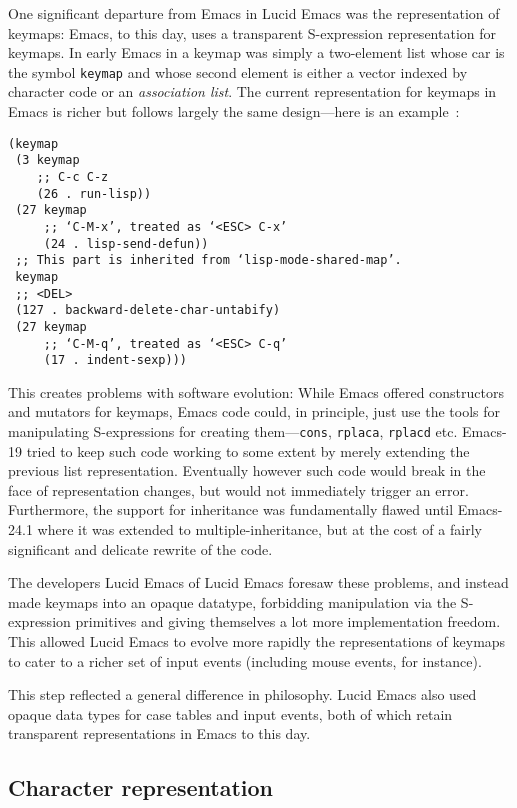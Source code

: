 \documentclass[format=acmsmall, review=false, screen=true]{acmart}
\begin{document}
One significant departure from Emacs in Lucid Emacs was the
representation of keymaps: Emacs, to this day, uses a transparent
S-expression representation for keymaps.
In early Emacs in a keymap was
simply a two-element list whose car is the symbol \texttt{keymap} and
whose second element is either a vector indexed by character code or an
\emph{association list}.
The current representation for keymaps in Emacs is richer but follows
largely the same design---here is an example~\cite{ELispManual2018}:
%
\begin{verbatim}
(keymap
 (3 keymap
    ;; C-c C-z
    (26 . run-lisp))
 (27 keymap
     ;; ‘C-M-x’, treated as ‘<ESC> C-x’
     (24 . lisp-send-defun))
 ;; This part is inherited from ‘lisp-mode-shared-map’.
 keymap
 ;; <DEL>
 (127 . backward-delete-char-untabify)
 (27 keymap
     ;; ‘C-M-q’, treated as ‘<ESC> C-q’
     (17 . indent-sexp)))
\end{verbatim}
%
This creates problems with software evolution: While Emacs offered
constructors and mutators for keymaps, Emacs code could, in principle,
just use the tools for manipulating S-expressions for creating
them---\texttt{cons}, \texttt{rplaca}, \texttt{rplacd} etc.
Emacs-19 tried to keep such code working to some extent by merely
extending the previous list representation.
Eventually however such code would break in the face of representation
changes, but would not immediately trigger an error.  Furthermore, the
support for inheritance was fundamentally flawed until Emacs-24.1 where it
was extended to multiple-inheritance, but at the cost of a fairly significant
and delicate rewrite of the code.

The developers Lucid Emacs of Lucid Emacs foresaw these problems, and
instead made keymaps into an opaque datatype, forbidding manipulation via the
S-expression primitives and giving themselves a lot more implementation
freedom.  This allowed Lucid Emacs to evolve more rapidly the
representations of keymaps to cater to a richer set of input events
(including mouse events, for instance).

This step reflected a general difference in philosophy.  Lucid Emacs
also used opaque data types for case tables and input events, both of
which retain transparent representations in Emacs to this day.

\subsection{Character representation}
\label{sec:character-representation}
\end{document}
